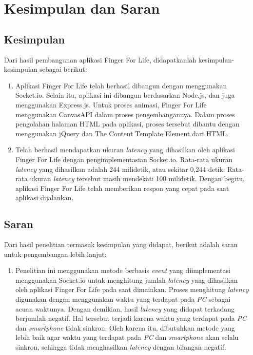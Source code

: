 \chapter{Kesimpulan dan Saran}
\label{chap:kesdansaran}

\section{Kesimpulan}
\label{sec:kesimpulan}
Dari hasil pembangunan aplikasi Finger For Life, didapatkanlah kesimpulan-kesimpulan sebagai berikut:

\begin{enumerate}
	\item Aplikasi Finger For Life telah berhasil dibangun dengan menggunakan Socket.io. Selain itu, aplikasi ini dibangun berdasarkan Node.js, dan juga menggunakan Express.js. Untuk proses animasi, Finger For Life menggunakan CanvasAPI dalam proses pengembangannya. Dalam proses pengolahan halaman HTML pada aplikasi, proses tersebut dibantu dengan menggunakan jQuery dan The Content Template Element dari HTML.
	
	\item Telah berhasil mendapatkan ukuran \textit{latency} yang dihasilkan oleh aplikasi Finger For Life dengan pengimplementasian Socket.io. Rata-rata ukuran \textit{latency} yang dihasilkan adalah 244 milidetik, atau sekitar 0,244 detik. Rata-rata ukuran \textit{latency} tersebut masih mendekati 100 milidetik. Dengan begitu, aplikasi Finger For Life telah memberikan respon yang cepat pada saat aplikasi dijalankan.
\end{enumerate}

\section{Saran}
\label{sec:saran}

Dari hasil penelitian termasuk kesimpulan yang didapat, berikut adalah saran untuk pengembangan lebih lanjut:

\begin{enumerate}
	\item Penelitian ini menggunakan metode berbasis \textit{event} yang diimplementasi menggunakan Socket.io untuk menghitung jumlah \textit{latency} yang dihasilkan oleh aplikasi Finger For Life pada saat dimainkan. Proses menghitung \textit{latency} digunakan dengan menggunakan waktu yang terdapat pada \textit{PC} sebagai acuan waktunya. Dengan demikian, hasil \textit{latency} yang didapat terkadang berjumlah negatif. Hal tersebut terjadi karena waktu yang terdapat pada \textit{PC} dan \textit{smartphone} tidak sinkron. Oleh karena itu, dibutuhkan metode yang lebih baik agar waktu yang terdapat pada \textit{PC} dan \textit{smartphone} akan selalu sinkron, sehingga tidak menghasilkan \textit{latency} dengan bilangan negatif.
\end{enumerate}